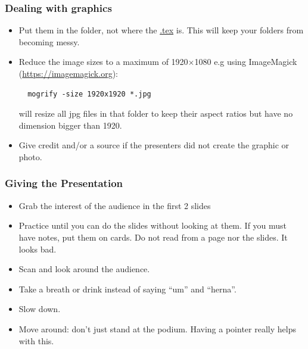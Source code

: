 \documentclass[aspectratio=169]{rubeamer}
\begin{document}
\begin{frame}[fragile]%
  \frametitle{Dealing with graphics}
  \begin{itemize}
  \item Put them in the  folder, not where the \url{.tex} is.  This will keep your folders from becoming messy.
  \item Reduce the image sizes to a maximum of 1920$\times$1080 e.g using ImageMagick (\url{https://imagemagick.org}):
\begin{verbatim}
  mogrify -size 1920x1920 *.jpg
\end{verbatim}
    will resize all jpg files in that folder to keep their aspect ratios but have no dimension bigger than 1920.
    \item Give credit and/or a source if the presenters did not create the graphic or photo.
  \end{itemize}
  
\end{frame}

\begin{frame}
  \frametitle{Giving the Presentation}
  \begin{itemize}
  \item Grab the interest of the audience in the first 2 slides
  \item Practice until you can do the slides without looking at them.
    If you must have notes, put them on cards.  Do not read from a page
    nor the slides.  It looks bad.
  \item Scan and look around the audience.
  \item Take a breath or drink instead of saying ``um'' and ``herna''.
  \item Slow down.
  \item Move around: don't just stand at the podium.  Having a pointer really helps with this.
  \end{itemize}
\end{frame}
\end{document}
